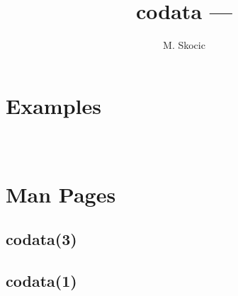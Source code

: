 \documentclass[11pt]{article}
\title{codata --- \FPMVERSION}
\author{M. Skocic}
\begin{document}
\maketitle
\tableofcontents
 


\section{Examples}
\inputminted{Fortran}{../../example/example.f90}
\inputminted{c}{../../example/example.c}
\inputminted{python}{../../example/example.py}


\clearpage
\section{Man Pages}
\subsection{codata(3)}
\fvset{}

\clearpage
\subsection{codata(1)}
\fvset{}
    


\clearpage
\nocite{*}
\printbibliography[heading=bibintoc]
\end{document}
